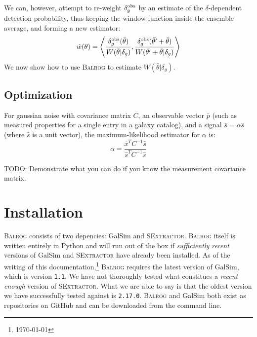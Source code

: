 \documentclass[12pt]{book}
\newcommand{\codett}[1]{\lstinline{#1}}
\newcommand{\py}{Python}
\newcommand{\galsim}{GalSim}
\newcommand{\balrog}{\textsc{Balrog}}
\newcommand{\sex}{\textsc{SExtractor}}
\newcommand{\ericdate}{\mydate\today}
\begin{document}
We can, however, attempt to re-weight $\delta_g^{\rm obs}$ by an estimate of the
$\delta$-dependent detection probability, thus keeping the window
function inside the ensemble-average, and forming a new estimator:
\begin{equation}
\hat{w}(\theta) = \left<\frac{\delta_g^{\rm obs}(\bar{\theta})}{W(\bar{\theta}|\delta_g)},\frac{\delta_g^{\rm obs}(\bar{\theta'}+\bar{\theta})}{W(\bar{\theta'}+\bar{\theta}|\delta_g)}\right>
\end{equation}
We now show how to use \balrog{} to estimate $W(\bar{\theta}|\delta_g)$.


\section{Optimization}
For gaussian noise with covariance matrix $C$, an observable vector
$\bar{p}$ (such as measured properties for a single entry in a galaxy
catalog), and a signal $\bar{s} = \alpha\hat{s}$ (where $\hat{s}$ is a
unit vector), the maximum-likelihood estimator for $\alpha$ is:
\begin{equation}
\alpha = \frac{\bar{x}^T C^{-1} \hat{s}}{\hat{s}^T C^{-1} \hat{s}}
\end{equation}

TODO: Demonstrate what you can do if you know the measurement
covariance matrix.



\chapter{Installation}
\label{sec:install}

\balrog{} consists of two depencies: \galsim{} and \sex{}.
\balrog{} itself is written entirely in \py{} and will run out of the box if  
\emph{sufficiently recent} versions of \galsim{} and \sex{} have already been installed.
As of the writing of this documentation,\footnote{\label{foot:date}\ericdate} 
\balrog{} requires the latest version of \galsim{}, which is version \codett{1.1}.
We have not thoroughly tested what constitues a \emph{recent enough} version of \sex{}.
What we are able to say is that the oldest version we have successfully tested against is \codett{2.17.0}.
\balrog{} and \galsim{} both exist as repositories on GitHub and can be downloaded 
from the command line.

\begin{cmdline}
\end{cmdline}
\end{document}
